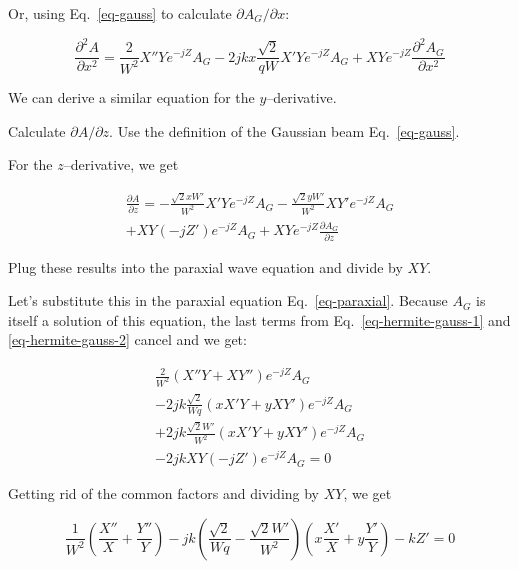 Or, using Eq.~\ref{eq-gauss} to calculate $\partial A_G / \partial x$:

\begin{equation}
\frac{\partial^2 A}{\partial x^2} = \frac{2}{W^2}X''Ye^{-jZ} A_G  - 2j k x \frac{\sqrt{2}}{qW}X'Ye^{-jZ}A_G  + XYe^{-jZ} \frac{\partial^2 A_G}{\partial x^2} \label{eq-hermite-gauss-1}
\end{equation} 

We can derive a similar equation for the $y$--derivative.

\begin{cue}
Calculate $\partial A / \partial z$. Use the definition of the Gaussian beam Eq.~\ref{eq-gauss}. 
\end{cue}

For the $z$--derivative, we get

\begin{align}
\frac{\partial A}{\partial z} =  -\frac{\sqrt{2}x W'}{W^2}X'Ye^{-jZ} A_G -\frac{\sqrt{2}y W'}{W^2}XY'e^{-jZ} A_G \nonumber \\ 
+ XY\left(-jZ'\right)e^{-jZ} A_G + XYe^{-jZ}\frac{\partial A_G}{\partial z} \label{eq-hermite-gauss-2}
\end{align} 

\begin{cue}
Plug these results into the paraxial wave equation and divide by $XY$.
\end{cue}

Let's substitute this in the paraxial equation Eq.~\ref{eq-paraxial}. Because $A_G$ is itself a solution of this equation, the last terms from Eq.~\ref{eq-hermite-gauss-1} and \ref{eq-hermite-gauss-2} cancel and we get:

\begin{align}
\frac{2}{W^2}\left(X''Y+XY''\right)e^{-jZ} A_G  \nonumber \\
-2jk \frac{\sqrt{2}}{Wq}\left(xX'Y+yXY'\right)e^{-jZ}A_G \nonumber \\
+2jk \frac{\sqrt{2} W'}{W^2}\left(xX'Y+yXY'\right)e^{-jZ}A_G \nonumber \\
-2jk XY\left(-jZ'\right)e^{-jZ} A_G = 0
\end{align}

Getting rid of the common factors and dividing by $XY$, we get

\begin{equation}
\frac{1}{W^2}\left(\frac{X''}{X}+\frac{Y''}{Y}\right)  
- j k \left(\frac{\sqrt{2}}{Wq} - \frac{\sqrt{2}W'}{W^2}\right)\left(x\frac{X'}{X}+y\frac{Y'}{Y}\right)
-kZ' = 0
\end{equation} 

